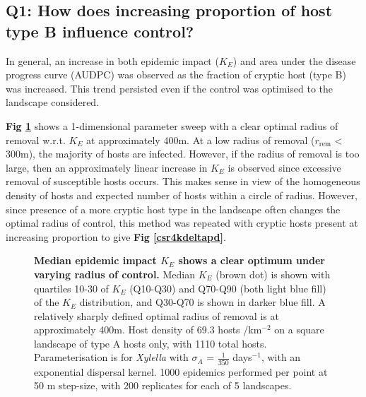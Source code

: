 \documentclass[11pt,letterpaper]{article}
\begin{document}
%




\subsection*{Q1: How does increasing proportion of host type B influence control?}

In general, an increase in both epidemic impact ($K_E$) and area under the disease progress curve (AUDPC) was observed as the fraction of cryptic host (type B) was increased. This trend persisted even if the control was optimised to the landscape considered. 

\textbf{Fig \ref{1d}} shows a 1-dimensional parameter sweep with a clear optimal radius of removal w.r.t. $K_E$ at approximately 400m. At a low radius of removal ($r_\mathrm{rem}$ < 300m), the majority of hosts are infected. However, if  the radius of removal is too large, then an approximately linear increase in $K_E$ is observed since excessive removal of susceptible hosts occurs. This makes sense in view of the homogeneous density of hosts and expected number of hosts within a circle of radius. However, since presence of a more cryptic host type in the landscape often changes the optimal radius of control,  this method was repeated with cryptic hosts present at increasing proportion to give \textbf{Fig \ref{csr4kdeltapd}}.

\begin{figure}[h]
	\centering
	
	\vspace{10mm}
	\caption { \label{1d} \textbf{Median epidemic impact $K_{E}$ shows a clear optimum under varying radius of control.} Median $K_E$ (brown dot) is shown with quartiles 10-30 of $K_E$ (Q10-Q30) and Q70-Q90 (both light blue fill) of the $K_E$ distribution, and Q30-Q70 is shown in darker blue fill. A relatively sharply defined optimal radius of removal is at approximately 400m. Host density of 69.3 hosts /km$^{-2}$ on a square landscape of type A hosts only, with 1110 total hosts. Parameterisation is for \emph{Xylella} with $\sigma_{A}$ = $\frac{1}{350}$ days$^{-1}$, with an exponential dispersal kernel. 1000 epidemics performed per point at 50 m step-size, with 200 replicates for each of 5 landscapes.}
	\vspace{10mm}
\end{figure}
\end{document}
